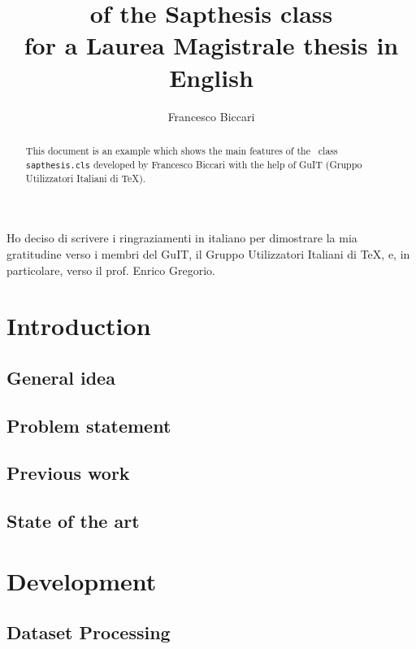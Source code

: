 \documentclass[LaM,binding=0.6cm]{sapthesis}
\title{of the Sapthesis class\\ for a Laurea Magistrale thesis in English}
\author{Francesco Biccari}
\begin{document}
\frontmatter

\maketitle

\dedication{Dedicated to\\ Donald Knuth}

\begin{abstract}
This document is an example which shows the main features of
the \LaTeXe\ class \texttt{sapthesis.cls} developed by Francesco Biccari
with the help of GuIT (Gruppo Utilizzatori Italiani di \TeX).
\end{abstract}

\begin{acknowledgments}
Ho deciso di scrivere i ringraziamenti in italiano
per dimostrare la mia gratitudine verso i membri
del GuIT, il Gruppo Utilizzatori Italiani di \TeX, e, in particolare,
verso il prof. Enrico Gregorio.
\end{acknowledgments}

\tableofcontents






\mainmatter

\chapter{Introduction}
\section{General idea}
\section{Problem statement}
\section{Previous work}
\section{State of the art}

\chapter{Development}

\section{Dataset Processing }
\end{document}
